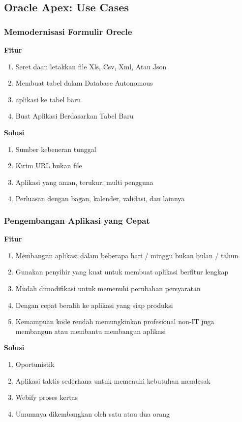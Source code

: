 \documentclass{article}
\begin{document}
\subsection{Oracle Apex: Use Cases}
\subsubsection{	Memodernisasi Formulir Orecle }
\textbf{Fitur}
\begin{enumerate}
    \item Seret daan letakkan file Xls, Csv, Xml, Atau Json
\item Membuat tabel dalam Database Autonomous
\item aplikasi ke tabel baru
\item Buat Aplikasi Berdasarkan Tabel Baru

\end{enumerate}
\textbf{Solusi}
\begin{enumerate}
\item Sumber kebeneran tunggal
\item Kirim URL bukan file
\item Aplikasi yang aman, terukur, multi pengguna
\item Perluasan dengan bagan, kalender, validasi, dan lainnya

\end{enumerate}
\subsubsection{Pengembangan Aplikasi yang Cepat}
\textbf{Fitur}
\begin{enumerate}
    \item Membangun aplikasi dalam beberapa hari / minggu bukan bulan / tahun
\item Gunakan penyihir yang kuat untuk membuat aplikasi berfitur lengkap
\item Mudah dimodifikasi untuk memenuhi perubahan persyaratan
\item  Dengan cepat beralih ke aplikasi yang siap produksi\\
\item Kemampuan kode rendah memungkinkan profesional non-IT juga membangun atau membantu membangun aplikasi\\

\end{enumerate}

\textbf{Solusi}
\begin{enumerate}
    \item Oportunistik
\item Aplikasi taktis sederhana untuk memenuhi kebutuhan mendesak
\item Webify proses kertas
\item Umumnya dikembangkan oleh satu atau dua orang

\end{enumerate}
\end{document}
